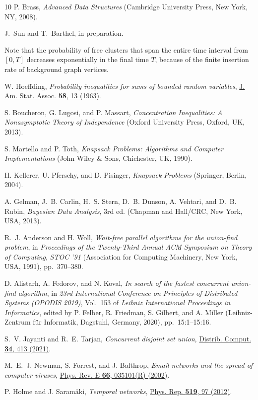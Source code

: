 \documentclass[english,10pt,aps,pra,twocolumn,superscriptaddress,floatfix,fleqn]{revtex4-2}
\begin{document}
\begin{thebibliography}{10}
P. Brass, {\em Advanced Data Structures} (Cambridge University Press, New York,
  NY, 2008).

J.\ Sun and T.\ Barthel, in preparation.

Note that the probability of free clusters that span the entire time interval
  from $[0,T]$ decreases exponentially in the final time $T$, because of the
  finite insertion rate of background graph vertices.

W. Hoeffding, {\em Probability inequalities for sums of bounded random
  variables}, \href{http://dx.doi.org/10.1080/01621459.1963.10500830} {J. Am.
  Stat. Assoc. {\bf 58},  13  (1963)}.

S. Boucheron, G. Lugosi, and P. Massart, {\em Concentration Inequalities: A
  Nonasymptotic Theory of Independence} (Oxford University Press, Oxford, UK,
  2013).

S. Martello and P. Toth, {\em Knapsack Problems: Algorithms and Computer
  Implementations} (John Wiley \& Sons, Chichester, UK, 1990).

H. Kellerer, U. Pferschy, and D. Pisinger, {\em Knapsack Problems} (Springer,
  Berlin, 2004).

A. Gelman, J.~B. Carlin, H.~S. Stern, D.~B. Dunson, A. Vehtari, and D.~B.
  Rubin, {\em Bayesian Data Analysis}, 3rd ed. (Chapman and Hall/CRC, New York,
  USA, 2013).

R.~J. Anderson and H. Woll, {\em Wait-free parallel algorithms for the
  union-find problem},  in {\em Proceedings of the Twenty-Third Annual ACM
  Symposium on Theory of Computing}, {\em STOC '91} (Association for Computing
  Machinery, New York, USA, 1991), pp.\ 370--380.

D. Alistarh, A. Fedorov, and N. Koval, {\em In search of the fastest concurrent
  union-find algorithm},  in {\em 23rd International Conference on Principles
  of Distributed Systems (OPODIS 2019)}, Vol.~153 of {\em Leibniz International
  Proceedings in Informatics}, edited by P. Felber, R. Friedman, S. Gilbert,
  and A. Miller (Leibniz-Zentrum f{\"u}r Informatik, Dagstuhl, Germany, 2020),
  pp.\ 15:1--15:16.

S.~V. Jayanti and R.~E. Tarjan, {\em Concurrent disjoint set union},
  \href{http://dx.doi.org/10.1007/s00446-020-00388-x} {Distrib. Comput. {\bf
  34},  413  (2021)}.

M.~E.~J. Newman, S. Forrest, and J. Balthrop, {\em Email networks and the
  spread of computer viruses},
  \href{http://dx.doi.org/10.1103/PhysRevE.66.035101} {Phys. Rev. E {\bf 66},
  035101(R)  (2002)}.

P. Holme and J. Saram\"{a}ki, {\em Temporal networks},
  \href{http://dx.doi.org/10.1016/j.physrep.2012.03.001} {Phys. Rep. {\bf 519},
   97  (2012)}.

\end{thebibliography}
\end{document}
